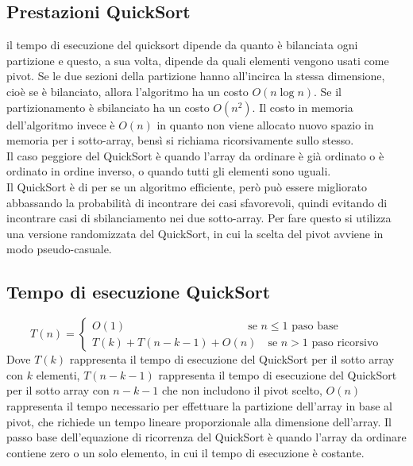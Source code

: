 \subsection{Prestazioni QuickSort}
il tempo di esecuzione del quicksort dipende da quanto è bilanciata ogni partizione e questo, a sua volta, dipende da quali elementi vengono usati come pivot. Se le due sezioni della partizione hanno all'incirca la stessa dimensione, cioè se è bilanciato, allora l'algoritmo ha un costo $O(n \log n)$. Se il partizionamento è sbilanciato ha un costo $O(n^2)$. Il costo in memoria dell'algoritmo invece è $O(n)$ in quanto non viene allocato nuovo spazio in memoria per i sotto-array, bensì si richiama ricorsivamente sullo stesso. \\
Il caso peggiore del QuickSort è quando l'array da ordinare è già ordinato o è ordinato in ordine inverso, o quando tutti gli elementi sono uguali. \\
Il QuickSort è di per se un algoritmo efficiente, però può essere migliorato abbassando la probabilità di incontrare dei casi sfavorevoli, quindi evitando di incontrare casi di sbilanciamento nei due sotto-array. Per fare questo si utilizza una versione randomizzata del QuickSort, in cui la scelta del pivot avviene in modo pseudo-casuale.
\subsection{Tempo di esecuzione QuickSort}
$$T(n)=
\begin{cases}
    O(1) \qquad \qquad \qquad \qquad \qquad \quad \text{se } n\le 1 \text{ paso base}\\
    T(k)+T(n-k-1)+O(n) \quad \text{se } n > 1 \text{ paso ricorsivo}
\end{cases}$$
\noindent Dove $T(k)$ rappresenta il tempo di esecuzione del QuickSort per il sotto array con $k$ elementi, $T(n-k-1)$ rappresenta il tempo di esecuzione del QuickSort per il sotto array con $n-k-1$ che non includono il pivot scelto, $O(n)$ rappresenta il tempo necessario per effettuare la partizione dell'array in base al pivot, che richiede un tempo lineare proporzionale alla dimensione dell'array. Il passo base dell'equazione di ricorrenza del QuickSort è quando l'array da ordinare contiene zero o un solo elemento, in cui il tempo di esecuzione è costante.

